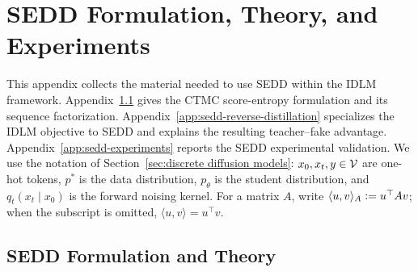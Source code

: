 \section{\texorpdfstring{SEDD Formulation, Theory, and Experiments}{SEDD Formulation, Theory, and Experiments}}
\label{app:details of considered processes}

This appendix collects the material needed to use SEDD within the IDLM framework. Appendix~\ref{app:sedd-formulation-theory} gives the CTMC score-entropy formulation and its sequence factorization. Appendix~\ref{app:sedd-reverse-distillation} specializes the IDLM objective to SEDD and explains the resulting teacher--fake advantage. Appendix~\ref{app:sedd-experiments} reports the SEDD experimental validation. We use the notation of Section~\ref{sec:discrete diffusion models}: $x_0,x_t,y\in\mathcal{V}$ are one-hot tokens, $p^*$ is the data distribution, $p_\theta$ is the student distribution, and $q_t(x_t\mid x_0)$ is the forward noising kernel. For a matrix $A$, write $\langle u,v\rangle_A\vcentcolon=u^\top A v$; when the subscript is omitted, $\langle u,v\rangle=u^\top v$.

\subsection{\texorpdfstring{SEDD Formulation and Theory}{SEDD Formulation and Theory}}
\label{app:sedd-formulation-theory}

